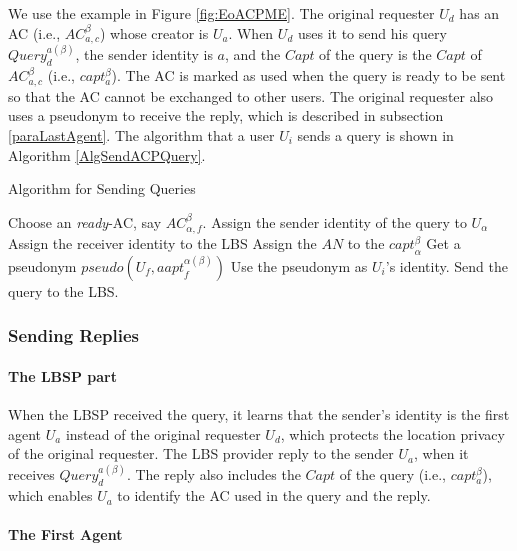 \documentclass[conference]{IEEEtran}
\begin{document}
We use the example in Figure \ref{fig:EoACPME}. The original requester $U_d$ has an AC (i.e., ${AC}^{\beta }_{a,c}$) whose creator is $U_a$. When $U_d$ uses it to send his query ${Query}^{a\left(\beta\right)}_d$, the sender identity is $a$, and the $Capt$ of the query is the $Capt$ of ${AC}^{\beta }_{a,c}$ (i.e., $capt_a^\beta$). The AC is marked as used when the query is ready to be sent so that the AC cannot be exchanged to other users. The original requester also uses a pseudonym to receive the reply, which is described in subsection \ref{paraLastAgent}. The algorithm that a user $U_i$ sends a query is shown in Algorithm \ref{AlgSendACPQuery}.


\begin{algorithm} [hbtp]
\caption{Algorithm for Sending Queries}\label{AlgSendACPQuery}
\begin{algorithmic}[1]
 {}
\State Choose an \textit{ready}-AC, say ${AC}_{\alpha,f}^{\beta}$.
\State Assign the sender identity of the query to $U_{\alpha}$
\State Assign the receiver identity to the LBS
\State Assign the $AN$ to the ${capt}_{\alpha}^{\beta}$
\State Get a pseudonym $pseudo\left(U_f,{aapt}_f^{\alpha \left(\beta \right)}\right)$
\State Use the pseudonym as $U_i$’s identity.
\State Send the query to the LBS.
\EndProcedure
\end{algorithmic}
\end{algorithm}

\subsubsection{ Sending Replies}


\paragraph{ The LBSP part}

When the LBSP received the query, it learns that the sender's identity is the first agent $U_a$ instead of the original requester $U_d$, which protects the location privacy of the original requester. The LBS provider reply to the sender $U_a$, when it receives ${Query}^{a\left(\beta\right)}_d$. The reply also includes the $Capt$ of the query (i.e., $capt_a^\beta$), which enables $U_a$ to identify the AC used in the query and the reply.

\paragraph{ The First Agent}
\end{document}
